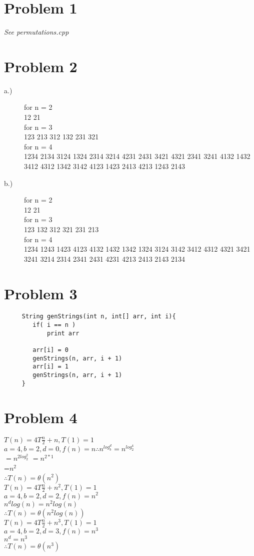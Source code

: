 \documentclass[12pt,letterpaper]{article}
\begin{document}
\section*{Problem 1}
\textit{See permutations.cpp}


\section*{Problem 2}
\begin{description}
\item[a.)] for n = 2\\
12 21\\
for n = 3\\
123 213 312 132 231 321\\
for n = 4\\
1234 2134 3124 1324 2314 3214 4231 2431 3421 4321 2341 3241 4132 1432 3412 4312 1342 3142 4123 1423 2413 4213 1243 2143
\item[b.)] for n = 2\\
12 21\\
for n = 3\\
123 132 312 321 231 213\\
for n = 4\\
1234 1243 1423 4123 4132 1432 1342 1324 3124 3142 3412 4312 4321 3421 3241 3214 2314 2341 2431 4231 4213 2413 2143 2134
\end{description}

\section*{Problem 3}

     \begin{lstlisting}
     String genStrings(int n, int[] arr, int i){
     	if( i == n )
     		print arr
     	
     	arr[i] = 0
     	genStrings(n, arr, i + 1)
     	arr[i] = 1
     	genStrings(n, arr, i + 1)     
     }
    \end{lstlisting}
\newpage
\section*{Problem 4}
$T(n) = 4T\frac{n}{2}+n, T(1) = 1$\\
$a = 4, b = 2, d = 0, f(n) = n \therefore{} n^{log_{b}^{d}} = n^{log_{2}^{4}}$\\
$=n^{2log^{2}_{2}}$
$=n^{2*1}$\\
=$n^2$\\
$\therefore{} T(n) = \theta(n^2)$\\

$T(n) = 4T\frac{n}{2}+n^2, T(1) = 1$\\
$a = 4, b = 2, d = 2, f(n)=n^2$\\
$n^{d}log(n) = n^{2}log(n)$\\
$\therefore{} T(n) = \theta(n^{2}log(n))$\\
 
$T(n) = 4T\frac{n}{2}+n^3, T(1) = 1$\\
$a = 4, b = 2, d = 3, f(n) = n^{3}$\\
$n^{d} = n^{3}$\\
$\therefore{} T(n) = \theta(n^{3})$
\end{document}
